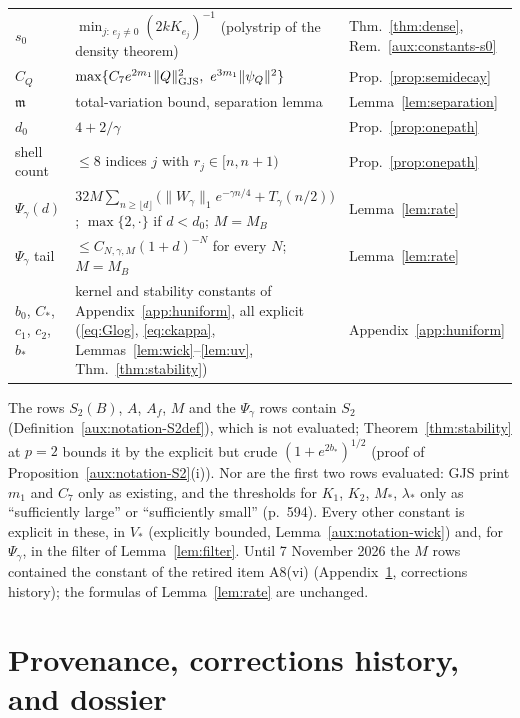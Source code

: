 \documentclass[11pt,a4paper]{article}
\theoremstyle{plain}
\theoremstyle{definition}
\theoremstyle{plain}
\theoremstyle{definition}
\begin{document}
\begin{center}
\begin{tabular}{@{}>{\raggedright}p{}>{\raggedright}p{}>{\raggedright\arraybackslash}p{}@{}}
$s_0$ & $\min_{j:\,e_j\ne0}(2kK_{e_j})^{-1}$ (polystrip of the density theorem) & Thm.~\ref{thm:dense}, Rem.~\ref{aux:constants-s0}\\
$\widehat C_Q$ & $\max\{C_7e^{2m_1}\|Q\|_{\rm GJS}^2,\ e^{3m_1}\|\psi_Q\|^2\}$ & Prop.~\ref{prop:semidecay}\\
$\mathfrak m$ & total-variation bound, separation lemma & Lemma~\ref{lem:separation}\\
$d_0$ & $4+2/\gamma$ & Prop.~\ref{prop:onepath}\\
shell count & $\le8$ indices $j$ with $r_j\in[n,n+1)$ & Prop.~\ref{prop:onepath}\\
$\Psi_\gamma(d)$ & $32M\sum_{n\ge\lfloor d\rfloor}\bigl(\|W_\gamma\|_1e^{-\gamma n/4}+T_\gamma(n/2)\bigr)$; $\max\{2,\cdot\}$ if $d<d_0$; $M=M_B$ & Lemma~\ref{lem:rate}\\
$\Psi_\gamma$ tail & $\le C_{N,\gamma,M}(1+d)^{-N}$ for every $N$; $M=M_B$ & Lemma~\ref{lem:rate}\\
$b_0$, $C_*$, $c_1$, $c_2$, $b_*$ & kernel and stability constants of Appendix~\ref{app:huniform}, all explicit (\eqref{eq:Glog}, \eqref{eq:ckappa}, Lemmas~\ref{lem:wick}--\ref{lem:uv}, Thm.~\ref{thm:stability}) & Appendix~\ref{app:huniform}\\
\bottomrule
\end{tabular}
\end{center}

The rows $S_2(B)$, $A$, $A_f$, $M$ and the $\Psi_\gamma$ rows contain $S_2$
(Definition~\ref{aux:notation-S2def}), which is not evaluated; Theorem~\ref{thm:stability} at
$p=2$ bounds it by the explicit but crude $(1+e^{2b_*})^{1/2}$ (proof of
Proposition~\ref{aux:notation-S2}(i)).  Nor are the first two rows evaluated: GJS print $m_1$
and $C_7$ only as existing, and the thresholds for $K_1$, $K_2$, $M_*$, $\lambda_*$ only as
``sufficiently large'' or ``sufficiently small'' (p.~594).  Every other constant is explicit
in these, in $V_*$ (explicitly bounded, Lemma~\ref{aux:notation-wick}) and, for $\Psi_\gamma$,
in the filter of Lemma~\ref{lem:filter}.  Until 7 November 2026 the
$M$ rows contained the constant of the retired item A8(vi) (Appendix~\ref{app:provenance},
corrections history); the formulas of Lemma~\ref{lem:rate} are unchanged.

\section{Provenance, corrections history, and dossier}\label{app:provenance}
\end{document}
